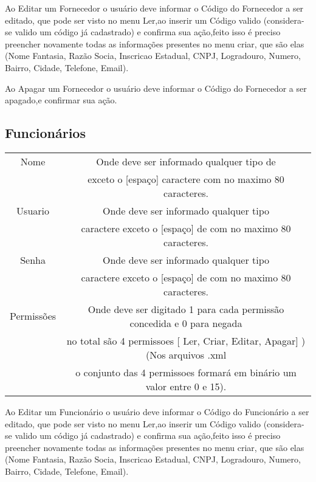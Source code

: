 \documentclass[titlepage]{article}
\begin{document}
				Ao Editar um Fornecedor o usuário deve informar o Código do Fornecedor a ser editado, que pode ser visto no menu Ler,ao inserir um Código valido (considera-se valido um código já cadastrado) e confirma sua ação,feito isso é preciso preencher novamente todas as informações presentes no menu criar, que são elas (Nome Fantasia, Razão Socia, Inscricao Estadual, CNPJ, Logradouro, Numero, Bairro, Cidade, Telefone, Email).

				Ao Apagar um Fornecedor o usuário deve informar o Código do Fornecedor a ser apagado,e confirmar sua ação. 

				\newpage
				\subsection{Funcionários}
				\begin{table}[h]%
					\begin{tabular}{|c|c|}
					\hline
					Nome  & Onde deve ser informado qualquer tipo de \\& exceto o [espaço] caractere com no maximo 80 caracteres.\\
					\hline
					Usuario  & Onde deve ser informado qualquer tipo \\& caractere exceto o [espaço] de com no maximo 80 caracteres.\\
					\hline
					Senha  & Onde deve ser informado qualquer tipo \\& caractere exceto o [espaço] de com no maximo 80 caracteres.\\
					\hline
					Permissões &  					Onde deve ser digitado 1 para cada permissão concedida e 0 para  negada\\& 					no total são 4 permissoes [ Ler, Criar, Editar, Apagar] )(Nos arquivos .xml\\& 					 o conjunto das 4 permissoes formará em binário um valor entre 0 e 15).\\ 					
					\hline
					\end{tabular}
				\end{table}

				Ao Editar um Funcionário o usuário deve informar o Código do Funcionário a ser editado, que pode ser visto no menu Ler,ao inserir um Código valido (considera-se valido um código já cadastrado) e confirma sua ação,feito isso é preciso preencher novamente todas as informações presentes no menu criar, que são elas (Nome Fantasia, Razão Socia, Inscricao Estadual, CNPJ, Logradouro, Numero, Bairro, Cidade, Telefone, Email).\\
\end{document}
